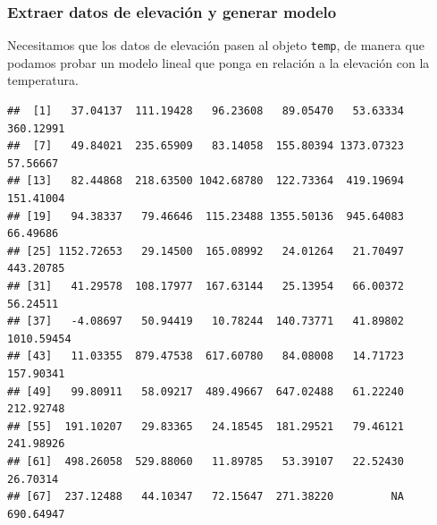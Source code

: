 \documentclass[11pt,]{article}
\newenvironment{Shaded}{\begin{snugshade}}{\end{snugshade}}
\newcommand{\KeywordTok}[1]{\textcolor[rgb]{0.13,0.29,0.53}{\textbf{#1}}}
\newcommand{\DecValTok}[1]{\textcolor[rgb]{0.00,0.00,0.81}{#1}}
\newcommand{\StringTok}[1]{\textcolor[rgb]{0.31,0.60,0.02}{#1}}
\newcommand{\CommentTok}[1]{\textcolor[rgb]{0.56,0.35,0.01}{\textit{#1}}}
\newcommand{\OperatorTok}[1]{\textcolor[rgb]{0.81,0.36,0.00}{\textbf{#1}}}
\newcommand{\NormalTok}[1]{#1}
\begin{document}
\subsubsection{Extraer datos de elevación y generar
modelo}\label{extraer-datos-de-elevaciuxf3n-y-generar-modelo}

Necesitamos que los datos de elevación pasen al objeto \texttt{temp}, de
manera que podamos probar un modelo lineal que ponga en relación a la
elevación con la temperatura.

\begin{Shaded}
\end{Shaded}

\begin{verbatim}
##  [1]   37.04137  111.19428   96.23608   89.05470   53.63334  360.12991
##  [7]   49.84021  235.65909   83.14058  155.80394 1373.07323   57.56667
## [13]   82.44868  218.63500 1042.68780  122.73364  419.19694  151.41004
## [19]   94.38337   79.46646  115.23488 1355.50136  945.64083   66.49686
## [25] 1152.72653   29.14500  165.08992   24.01264   21.70497  443.20785
## [31]   41.29578  108.17977  167.63144   25.13954   66.00372   56.24511
## [37]   -4.08697   50.94419   10.78244  140.73771   41.89802 1010.59454
## [43]   11.03355  879.47538  617.60780   84.08008   14.71723  157.90341
## [49]   99.80911   58.09217  489.49667  647.02488   61.22240  212.92748
## [55]  191.10207   29.83365   24.18545  181.29521   79.46121  241.98926
## [61]  498.26058  529.88060   11.89785   53.39107   22.52430   26.70314
## [67]  237.12488   44.10347   72.15647  271.38220         NA  690.64947
\end{verbatim}

\begin{Shaded}
\end{Shaded}
\end{document}
